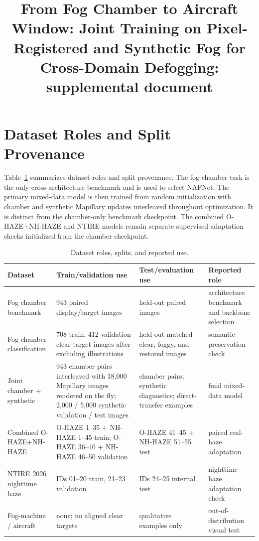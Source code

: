 \documentclass[9pt]{osa-supplemental-document}
\title{From Fog Chamber to Aircraft Window: Joint Training on Pixel-Registered and Synthetic Fog for Cross-Domain Defogging: supplemental document}
\author{} %
\begin{document}
\maketitle

\section{Dataset Roles and Split Provenance}

Table~\ref{tabS:dataset_roles} summarizes dataset roles and split
provenance. The fog-chamber task is the only cross-architecture
benchmark and is used to select NAFNet. The primary mixed-data model is
then trained from random initialization with chamber and synthetic
Mapillary updates interleaved throughout optimization. It is distinct
from the chamber-only benchmark checkpoint. The combined O-HAZE+NH-HAZE and
NTIRE models remain separate supervised adaptation checks initialized
from the chamber checkpoint.

\begin{table}[H]
\centering
\footnotesize
\setlength{\tabcolsep}{4pt}
\renewcommand{\arraystretch}{1.15}
\caption{Dataset roles, splits, and reported use.}
\label{tabS:dataset_roles}
\begin{tabular}{@{}>{\raggedright\arraybackslash}p{}>{\raggedright\arraybackslash}p{}>{\raggedright\arraybackslash}p{}>{\raggedright\arraybackslash}p{}@{}}
\toprule
\textbf{Dataset} & \textbf{Train/validation use} & \textbf{Test/evaluation use} & \textbf{Reported role} \\
\midrule
Fog chamber benchmark & 4{,}943 paired display/target images & 552 held-out paired images & architecture benchmark and backbone selection \\
Fog chamber classification & 3{,}708 train, 412 validation clear-target images after excluding illustrations & 460 held-out matched clear, foggy, and restored images & semantic-preservation check \\
Joint chamber + synthetic & 4{,}943 chamber pairs interleaved with 18{,}000 Mapillary images rendered on the fly; 2{,}000 / 5{,}000 synthetic validation / test images & 552 chamber pairs; synthetic diagnostics; direct-transfer examples & final mixed-data model \\
Combined O-HAZE+NH-HAZE & O-HAZE 1--35 + NH-HAZE 1--45 train; O-HAZE 36--40 + NH-HAZE 46--50 validation & O-HAZE 41--45 + NH-HAZE 51--55 test & paired real-haze adaptation \\
NTIRE 2026 nighttime haze & IDs 01--20 train, 21--23 validation & IDs 24--25 internal test & nighttime haze adaptation check \\
Fog-machine / aircraft & none; no aligned clear targets & qualitative examples only & out-of-distribution visual test \\
\bottomrule
\end{tabular}
\end{table}
\FloatBarrier
\end{document}

